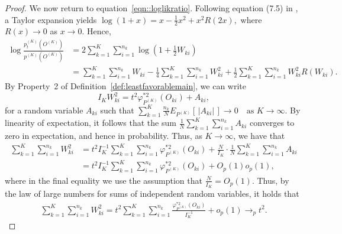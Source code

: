 \documentclass[11pt]{article}
\theoremstyle{plain}
\theoremstyle{definition}
\theoremstyle{remark}
\theoremstyle{definition}
\begin{document}
\begin{proof}
We now return to equation~\eqref{eqn::loglikratio}. Following equation (7.5) in \citet{van2000asymptotic}, a Taylor expansion yields $\log (1 + x) = x - \frac{1}{2} x^2 + x^2 R(2x),$
where \( R(x) \to 0 \) as \( x \to 0 \). Hence,
\begin{align}
    \log \frac{p_{t}^{(K)}(O^{(K)})}{p^{(K)}(O^{(K)})} 
    &= 2 \sum_{k=1}^K \sum_{i=1}^{n_k} \log\left(1 + \tfrac{1}{2} W_{ki}\right) \nonumber \\
    &= \sum_{k=1}^K \sum_{i=1}^{n_k} W_{ki} 
    - \frac{1}{4} \sum_{k=1}^K \sum_{i=1}^{n_k} W_{ki}^2 
    + \frac{1}{2} \sum_{k=1}^K \sum_{i=1}^{n_k} W_{ki}^2 R(W_{ki}). \label{eqn::LANalmost}
\end{align}
By Property~2 of Definition~\ref{def:leastfavorablemain}, we can write
\[
I_K W_{ki}^2 =  t^2 \varphi_{P^{(K)}}^{*2}(O_{ki}) + A_{ki},
\]
for a random variable \( A_{ki} \) such that $\sum_{k=1}^K \frac{n_k}{N} E_{P^{(K)}}[\,|A_{ki}|\,] \longrightarrow 0 \quad \text{as } K \to \infty.$
By linearity of expectation, it follows that the sum \( \frac{1}{N} \sum_{k=1}^K \sum_{i=1}^{n_k} A_{ki} \) converges to zero in expectation, and hence in probability. Thus,  as \( K \rightarrow \infty \), we have that
\begin{align*}
     \sum_{k=1}^K \sum_{i=1}^{n_k} W_{ki}^2 
     &= t^2 I_K^{-1} \sum_{k=1}^K \sum_{i=1}^{n_k} \varphi_{P^{(K)}}^{*2}(O_{ki}) 
     + \frac{N}{I_K} \cdot \frac{1}{N} \sum_{k=1}^K \sum_{i=1}^{n_k} A_{ki} \\
     &= t^2 I_K^{-1} \sum_{k=1}^K \sum_{i=1}^{n_k} \varphi_{P^{(K)}}^{*2}(O_{ki}) 
     + O_p(1) o_p(1),
\end{align*}
where in the final equality we use the assumption that \( \frac{N}{I_K} = O_p(1) \). Thus, by the law of large numbers for sums of independent random variables, it holds that
\begin{align*}
     \sum_{k=1}^K \sum_{i=1}^{n_k} W_{ki}^2  = t^2  \sum_{k=1}^K \sum_{i=1}^{n_k} \frac{\varphi_{P^{(K)}}^{*2}(O_{ki})}{I_K^{-1} }  + o_p(1) \longrightarrow_p t^2.
\end{align*}



\end{proof}
\end{document}
